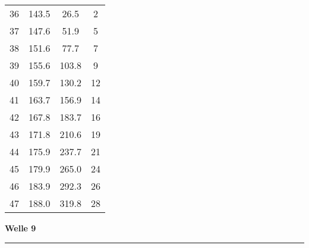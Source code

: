 \documentclass[10pt, a4paper]{article}
\begin{document}
\begin{center}
\begin{tabular}{c|c|c|c}
		36 & 143.5 & 26.5 & 2 \\
		37 & 147.6 & 51.9 & 5 \\
		38 & 151.6 & 77.7 & 7 \\
		39 & 155.6 & 103.8 & 9 \\
		40 & 159.7 & 130.2 & 12 \\
		41 & 163.7 & 156.9 & 14 \\
		42 & 167.8 & 183.7 & 16 \\
		43 & 171.8 & 210.6 & 19 \\
		44 & 175.9 & 237.7 & 21 \\
		45 & 179.9 & 265.0 & 24 \\
		46 & 183.9 & 292.3 & 26 \\
		47 & 188.0 & 319.8 & 28 \\
	\end{tabular}
\end{center}
\newpage
\centerline{{\bf Welle 9} }
\rule{1.0\textwidth}{0.5mm}
\end{document}
